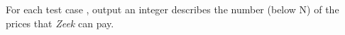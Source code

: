 For each test case , output an integer describes the number (below N) of the prices that \textit{Zeek} can pay.
